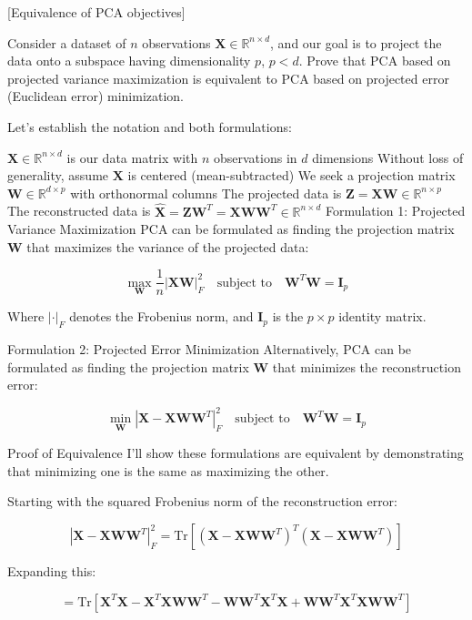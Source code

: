 \item {} [Equivalence of PCA objectives]

Consider a dataset of $n$ observations $\mathbf{X}\in \mathbb{R}^{n \times d}$, and our goal is to project the data onto a subspace having dimensionality $p$, $p<d$. Prove that PCA based on projected variance maximization is equivalent to PCA based on projected error (Euclidean error) minimization.

\solution


Let's establish the notation and both formulations:

$\mathbf{X} \in \mathbb{R}^{n \times d}$ is our data matrix with $n$ observations in $d$ dimensions
Without loss of generality, assume $\mathbf{X}$ is centered (mean-subtracted)
We seek a projection matrix $\mathbf{W} \in \mathbb{R}^{d \times p}$ with orthonormal columns
The projected data is $\mathbf{Z} = \mathbf{X}\mathbf{W} \in \mathbb{R}^{n \times p}$
The reconstructed data is $\hat{\mathbf{X}} = \mathbf{Z}\mathbf{W}^T = \mathbf{X}\mathbf{W}\mathbf{W}^T \in \mathbb{R}^{n \times d}$
Formulation 1: Projected Variance Maximization
PCA can be formulated as finding the projection matrix $\mathbf{W}$ that maximizes the variance of the projected data:

$$\max_{\mathbf{W}} \frac{1}{n} |\mathbf{X}\mathbf{W}|_F^2 \quad \text{subject to} \quad \mathbf{W}^T\mathbf{W} = \mathbf{I}_p$$

Where $|\cdot|_F$ denotes the Frobenius norm, and $\mathbf{I}_p$ is the $p \times p$ identity matrix.

Formulation 2: Projected Error Minimization
Alternatively, PCA can be formulated as finding the projection matrix $\mathbf{W}$ that minimizes the reconstruction error:

$$\min_{\mathbf{W}} |\mathbf{X} - \mathbf{X}\mathbf{W}\mathbf{W}^T|_F^2 \quad \text{subject to} \quad \mathbf{W}^T\mathbf{W} = \mathbf{I}_p$$

Proof of Equivalence
I'll show these formulations are equivalent by demonstrating that minimizing one is the same as maximizing the other.

Starting with the squared Frobenius norm of the reconstruction error:

$$|\mathbf{X} - \mathbf{X}\mathbf{W}\mathbf{W}^T|_F^2 = \text{Tr}[(\mathbf{X} - \mathbf{X}\mathbf{W}\mathbf{W}^T)^T(\mathbf{X} - \mathbf{X}\mathbf{W}\mathbf{W}^T)]$$

Expanding this:

$$= \text{Tr}[\mathbf{X}^T\mathbf{X} - \mathbf{X}^T\mathbf{X}\mathbf{W}\mathbf{W}^T - \mathbf{W}\mathbf{W}^T\mathbf{X}^T\mathbf{X} + \mathbf{W}\mathbf{W}^T\mathbf{X}^T\mathbf{X}\mathbf{W}\mathbf{W}^T]$$


